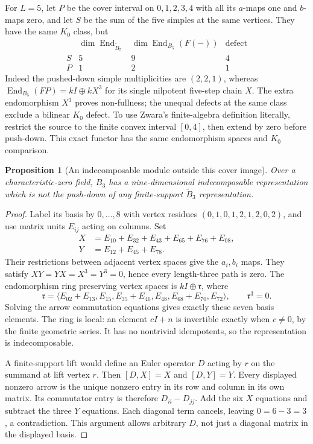 \documentclass[11pt]{article}
\newtheorem{proposition}[theorem]{Proposition}
\theoremstyle{definition}\newtheorem{definition}[theorem]{Definition}
\theoremstyle{remark}\newtheorem{remark}[theorem]{Remark}
\begin{document}
For $L=5$, let $P$ be the cover interval on $0,1,2,3,4$ with all its
$a$-maps one and $b$-maps zero, and let $S$ be the sum of the five simples
at the same vertices. They have the same $K_0$ class, but
\[
\begin{array}{c|ccc}
 &\dim\operatorname{End}_{\widetilde B_5}
 &\dim\operatorname{End}_{B_5}(F(-))&\text{defect}\\\hline
 S&5&9&4\\ P&1&2&1
\end{array}
\]
Indeed the pushed-down simple multiplicities are $(2,2,1)$, whereas
$\operatorname{End}_{B_5}(FP)=kI\oplus kX^3$ for its single nilpotent
five-step chain $X$. The extra endomorphism $X^3$ proves non-fullness;
the unequal defects at the same class exclude a bilinear $K_0$ defect.
To use Zwara's finite-algebra definition literally, restrict the source to
the finite convex interval $[0,4]$, then extend by zero before push-down.
This exact functor has the same endomorphism spaces and $K_0$ comparison.

\begin{proposition}[An indecomposable module outside this cover image]
\label{cover:band}
Over a characteristic-zero field, $B_3$ has a nine-dimensional
indecomposable representation which is not the push-down of any
finite-support $\widetilde B_3$ representation.
\end{proposition}
\begin{proof}
Label its basis by $0,\ldots,8$ with vertex residues
$(0,1,0,1,2,1,2,0,2)$, and use matrix units $E_{ij}$ acting on columns.
Set
\begin{align*}
 X&=E_{10}+E_{32}+E_{43}+E_{65}+E_{76}+E_{08},\\
 Y&=E_{12}+E_{45}+E_{78}.
\end{align*}
Their restrictions between adjacent vertex spaces give the $a_i,b_i$ maps.
They satisfy $XY=YX=X^3=Y^3=0$, hence every length-three path is zero.
The endomorphism ring preserving vertex spaces is $kI\oplus\mathfrak r$,
where
\[
 \mathfrak r=\langle E_{02}+E_{13},E_{15},E_{35}+E_{46},
                       E_{48},E_{68}+E_{70},E_{72}\rangle,
 \qquad \mathfrak r^3=0.
\]
Solving the arrow commutation equations gives exactly these seven basis
elements. The ring is local: an element $cI+n$ is invertible exactly when
$c\ne0$, by the finite geometric series. It has no nontrivial idempotents,
so the representation is indecomposable.

A finite-support lift would define an Euler operator $D$ acting by $r$ on
the summand at lift vertex $r$. Then $[D,X]=X$ and $[D,Y]=Y$.
Every displayed nonzero arrow is the unique nonzero entry in its row and
column in its own matrix. Its commutator entry is therefore
$D_{ii}-D_{jj}$. Add the six $X$ equations and subtract the three $Y$
equations. Each diagonal term cancels, leaving $0=6-3=3$, a contradiction.
This argument allows arbitrary $D$, not just a diagonal matrix in the
displayed basis.
\end{proof}
\end{document}
